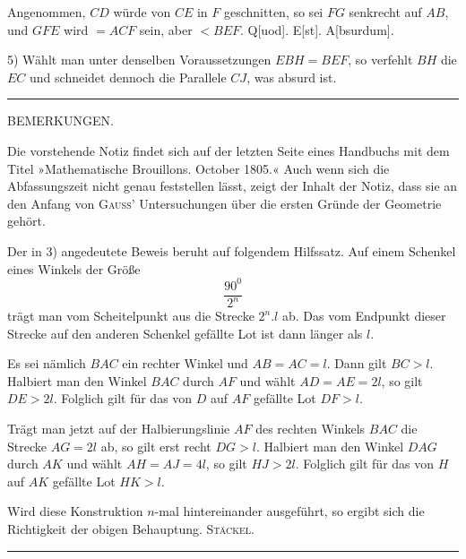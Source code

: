 Angenommen, $CD$ würde von $CE$ in $F$ geschnitten, so sei $FG$ senkrecht auf $AB$,
und $GFE$ wird $= ACF$ sein, aber $< BEF$. Q[uod]. E[st]. A[bsurdum].

5) Wählt man unter denselben Voraussetzungen $EBH = BEF$, so verfehlt $BH$ die $EC$
und schneidet dennoch die Parallele $CJ$, was absurd ist.

\bigskip
\hrule
\bigskip

\begin{center}BEMERKUNGEN.\end{center}

\smallskip

Die vorstehende Notiz findet sich auf der letzten Seite eines Handbuchs mit dem Titel »Mathematische Brouillons. October 1805.« Auch wenn sich die Abfassungszeit nicht genau feststellen lässt, zeigt der Inhalt der Notiz, dass sie an den Anfang von \textsc{Gauss}’ Untersuchungen über die ersten Gründe der Geometrie gehört.

Der in 3) angedeutete Beweis beruht auf folgendem Hilfssatz. Auf einem Schenkel eines Winkels der Größe
\[
\frac{90^{0}}{2^n}
\]
trägt man vom Scheitelpunkt aus die Strecke $2^n.l$ ab. Das vom Endpunkt dieser Strecke auf den anderen Schenkel gefällte Lot ist dann länger als $l$.

\begin{center}\end{center}

Es sei nämlich $BAC$ ein rechter Winkel und $AB = AC = l$. Dann gilt $BC > l$. Halbiert man den Winkel $BAC$ durch $AF$ und wählt $AD = AE = 2l$, so gilt $DE > 2l$. Folglich gilt für das von $D$ auf $AF$ gefällte Lot $DF > l$.

Trägt man jetzt auf der Halbierungslinie $AF$ des rechten Winkels $BAC$ die Strecke $AG = 2l$ ab, so gilt erst recht $DG > l$. Halbiert man den Winkel $DAG$ durch $AK$ und wählt $AH = AJ = 4l$, so gilt $HJ > 2l$. Folglich gilt für das von $H$ auf $AK$ gefällte Lot $HK > l$.

Wird diese Konstruktion $n$-mal hintereinander ausgeführt, so ergibt sich die Richtigkeit der obigen Behauptung.
\hfill \textsc{Stäckel}.

\bigskip
\hrule
